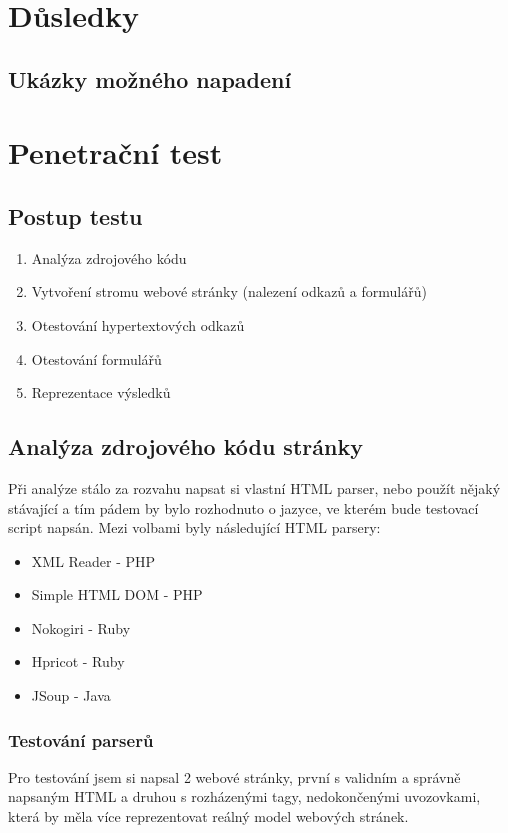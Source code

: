 \documentclass[12pt, a4paper]{report}
\begin{document}
\chapter{Důsledky}


\section{Ukázky možného napadení}

\chapter{Penetrační test}

\section{Postup testu}
\begin{enumerate}
\item Analýza zdrojového kódu
\item Vytvoření stromu webové stránky (nalezení odkazů a formulářů)
\item Otestování hypertextových odkazů
\item Otestování formulářů
\item Reprezentace výsledků
\end{enumerate}

\section{Analýza zdrojového kódu stránky}
Při analýze stálo za rozvahu napsat si vlastní HTML parser, nebo použít nějaký stávající a tím pádem by bylo rozhodnuto o jazyce, ve kterém bude testovací script napsán. Mezi volbami byly následující HTML parsery:
\begin{itemize}
\item XML Reader - PHP
\item Simple HTML DOM - PHP
\item Nokogiri - Ruby
\item Hpricot - Ruby
\item JSoup - Java
\end{itemize}

\subsection{Testování parserů}
Pro testování jsem si napsal 2 webové stránky, první s validním a správně napsaným HTML a druhou s rozházenými tagy, nedokončenými uvozovkami, která by měla více reprezentovat reálný model webových stránek.\\
\end{document}
